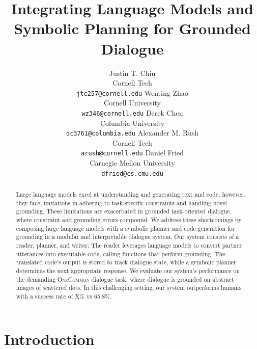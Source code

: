 \documentclass[11pt]{article}
\title{
Integrating Language Models and Symbolic Planning for Grounded Dialogue
}
\author{
Justin T. Chiu  \\
Cornell Tech \\
\texttt{jtc257@cornell.edu}
\And
Wenting Zhao \\
Cornell University \\
\texttt{wz346@cornell.edu}
\And
Derek Chen \\
Columbia University \\
\texttt{dc3761@columbia.edu}
\And
Alexander M. Rush \\
Cornell Tech \\
\texttt{arush@cornell.edu}
\And
Daniel Fried \\
Carnegie Mellon University \\
\texttt{dfried@cs.cmu.edu} 
}
\newcommand{\justin}[1]{{{\textcolor{purple}{(Justin: #1)}}}}
\begin{document}
\maketitle
\begin{abstract}
Large language models excel at understanding and generating text and code; however,
they face limitations in adhering to task-specific constraints and handling novel grounding.
These limitations are exacerbated in grounded task-oriented dialogue,
where constraint and grounding errors compound.
We address these shortcomings by composing large language models
with a symbolic planner and code generation for grounding in a modular and interpretable dialogue system.
Our system consists of a reader, planner, and writer:
The reader leverages language models to convert partner utterances into executable code,
calling functions that perform grounding.
The translated code's output is stored to track dialogue state,
while a symbolic planner determines the next appropriate response.
We evaluate our system's performance on the demanding \textsc{OneCommon} dialogue task,
where dialogue is grounded on abstract images of scattered dots.
In this challenging setting, our system outperforms humans with a success rate of X\% vs 65.8\%.
\end{abstract}

\section{Introduction}

\end{document}
